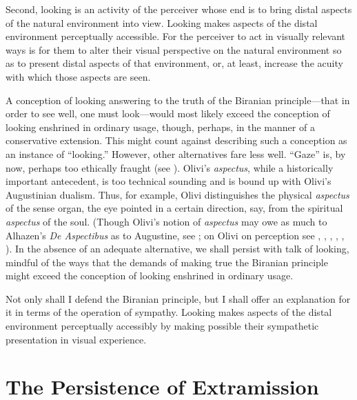 Second, looking is an activity of the perceiver whose end is to bring distal aspects of the natural environment into view. Looking makes aspects of the distal environment perceptually accessible. For the perceiver to act in visually relevant ways is for them to alter their visual perspective on the natural environment so as to present distal aspects of that environment, or, at least, increase the acuity with which those aspects are seen. 

A conception of looking answering to the truth of the Biranian principle---that in order to see well, one must look---would most likely exceed the conception of looking enshrined in ordinary usage, though, perhaps, in the manner of a conservative extension. This might count against describing such a conception as an instance of ``looking.'' However, other alternatives fare less well. ``Gaze'' is, by now, perhaps too ethically fraught (see \citealt{Jay:1994aa}). Olivi's \emph{aspectus}, while a historically important antecedent, is too technical sounding and is bound up with Olivi's Augustinian dualism. Thus, for example, Olivi distinguishes the physical \emph{aspectus} of the sense organ, the eye pointed in a certain direction, say, from the spiritual \emph{aspectus} of the soul. (Though Olivi's notion of \emph{aspectus} may owe as much to Alhazen's \emph{De Aspectibus} as to Augustine, see \citealt[41 especially n. 43]{Tachau:1988aa}; on Olivi on perception see \citealt[3--26, 39--54]{Tachau:1988aa}, \citealt[215--224]{Spruit:1994qq}, \citealt[121--124, 130--134, 168--181]{Pasnau:1997aa}, \citealt[part 1]{Toivanen:2009zf}, \citealt{Silva:2010zh}, \citealt[part 2]{Toivanen:2013ul}). In the absence of an adequate alternative, we shall persist with talk of looking, mindful of the ways that the demands of making true the Biranian principle might exceed the conception of looking enshrined in ordinary usage.

Not only shall I defend the Biranian principle, but I shall offer an explanation for it in terms of the operation of sympathy. Looking makes aspects of the distal environment perceptually accessibly by making possible their sympathetic presentation in visual experience.


\section{The Persistence of Extramission} %
\label{sec:the_persistence_of_extramission}

